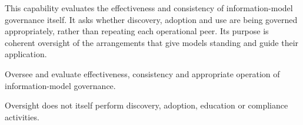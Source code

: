 This capability evaluates the effectiveness and consistency of information-model governance itself. It asks whether discovery, adoption and use are being governed appropriately, rather than repeating each operational peer. Its purpose is coherent oversight of the arrangements that give models standing and guide their application.



Oversee and evaluate effectiveness, consistency and appropriate operation of information-model governance.



Oversight does not itself perform discovery, adoption, education or compliance activities.


